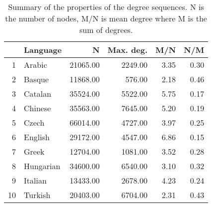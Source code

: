 \begin{table}[ht]
\centering
\begin{tabular}{rlrrrr}
	\toprule
		& Language & N & Max. deg. & M/N & N/M \\
	\midrule
	1 & Arabic & 21065.00 & 2249.00 & 3.35 & 0.30 \\
	2 & Basque & 11868.00 & 576.00 & 2.18 & 0.46 \\
	3 & Catalan & 35524.00 & 5522.00 & 5.75 & 0.17 \\
	4 & Chinese & 35563.00 & 7645.00 & 5.20 & 0.19 \\
	5 & Czech & 66014.00 & 4727.00 & 3.97 & 0.25 \\
	6 & English & 29172.00 & 4547.00 & 6.86 & 0.15 \\
	7 & Greek & 12704.00 & 1081.00 & 3.52 & 0.28 \\
	8 & Hungarian & 34600.00 & 6540.00 & 3.10 & 0.32\\
	9 & Italian & 13433.00 & 2678.00 & 4.23 & 0.24 \\
	10 & Turkish & 20403.00 & 6704.00 & 2.31 & 0.43 \\
	\bottomrule
\end{tabular}
\caption{Summary of the properties of the degree sequences. N is the number of 
nodes, M/N is mean degree where M is the sum of degrees.}
\label{table1}
\end{table}
